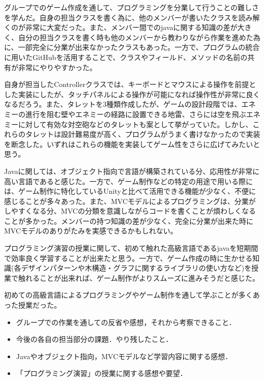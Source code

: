 \documentclass[11pt,a4j]{jarticle}
\begin{document}
グループでのゲーム作成を通して、プログラミングを分業して行うことの難しさを学んだ。自身の担当クラスを書く為に、他のメンバーが書いたクラスを読み解くのが非常に大変だった。また、メンバー間でのjavaに関する知識の差が大きく、自分の担当クラスを書く時も他のメンバーから教わりながら作業を進めた為に、一部完全に分業が出来なかったクラスもあった。一方で、プログラムの統合に用いたGitHubを活用することで、クラスやフィールド、メソッドの名前の共有が非常にやりやすかった。

自身が担当したControllerクラスでは、キーボードとマウスによる操作を前提とした実装にしたが、タッチパネルによる操作が可能になれば操作性が非常に良くなるだろう。また、タレットを3種類作成したが、ゲームの設計段階では、エネミーの進行を阻む壁やエネミーの経路に設置できる地雷、さらには空を飛ぶエネミーに対して有効な対空砲などのタレットも案として挙がっていた。しかし、これらのタレットは設計難易度が高く、プログラムがうまく書けなかったので実装を断念した。いずれはこれらの機能を実装してゲーム性をさらに広げてみたいと思う。

Javaに関しては、オブジェクト指向で言語が構築されている分、応用性が非常に高い言語であると感じた。一方で、ゲーム制作などの特定の用途で用いる際には、ゲーム制作に特化しているUnityと比べて活用できる機能が少なく、不便に感じることが多々あった。また、MVCモデルによるプログラミングは、分業がしやすくなる分、MVCの分類を意識しながらコードを書くことが煩わしくなることが多かった。メンバーの持つ知識の差が少なく、完全に分業が出来た時にMVCモデルのありがたみを実感できるかもしれない。

プログラミング演習の授業に関して、初めて触れた高級言語であるjavaを短期間で効率良く学習することが出来たと思う。一方で、ゲーム作成の時に生かせる知識(各デザインパターンや木構造・グラフに関するライブラリの使い方など)を授業で触れることが出来れば、ゲーム制作がよりスムーズに進みそうだと感じた。

初めての高級言語によるプログラミングやゲーム制作を通して学ぶことが多くあった授業だった。



\begin{itemize}
    \item グループでの作業を通しての反省や感想，それから考察できること．
    \item 今後の各自の担当部分の課題．やり残したこと．
    \item Javaやオブジェクト指向，MVCモデルなど学習内容に関する感想．
    \item 「プログラミング演習」の授業に関する感想や要望．
\end{itemize}
\end{document}
